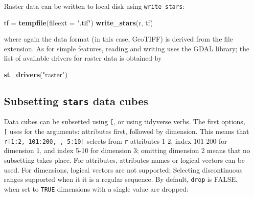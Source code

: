\documentclass[]{book}
\newenvironment{Shaded}{\begin{snugshade}}{\end{snugshade}}
\newcommand{\CommentTok}[1]{\textcolor[rgb]{0.56,0.35,0.01}{\textit{#1}}}
\newcommand{\DataTypeTok}[1]{\textcolor[rgb]{0.13,0.29,0.53}{#1}}
\newcommand{\DecValTok}[1]{\textcolor[rgb]{0.00,0.00,0.81}{#1}}
\newcommand{\KeywordTok}[1]{\textcolor[rgb]{0.13,0.29,0.53}{\textbf{#1}}}
\newcommand{\NormalTok}[1]{#1}
\newcommand{\OperatorTok}[1]{\textcolor[rgb]{0.81,0.36,0.00}{\textbf{#1}}}
\newcommand{\OtherTok}[1]{\textcolor[rgb]{0.56,0.35,0.01}{#1}}
\newcommand{\StringTok}[1]{\textcolor[rgb]{0.31,0.60,0.02}{#1}}
\begin{document}
Raster data can be written to local disk using \texttt{write\_stars}:

\begin{Shaded}
\begin{Highlighting}[]
\NormalTok{tf =}\StringTok{ }\KeywordTok{tempfile}\NormalTok{(}\DataTypeTok{fileext =} \StringTok{".tif"}\NormalTok{)}
\KeywordTok{write_stars}\NormalTok{(r, tf)}
\end{Highlighting}
\end{Shaded}

where again the data format (in this case, GeoTIFF) is derived from the file
extension. As for simple features, reading and writing uses the GDAL
library; the list of available drivers for raster data is obtained
by

\begin{Shaded}
\begin{Highlighting}[]
\KeywordTok{st_drivers}\NormalTok{(}\StringTok{"raster"}\NormalTok{)}
\end{Highlighting}
\end{Shaded}

\hypertarget{subsetting-stars-data-cubes}{%
\subsection{\texorpdfstring{Subsetting \texttt{stars} data cubes}{Subsetting stars data cubes}}\label{subsetting-stars-data-cubes}}

Data cubes can be subsetted using \texttt{{[}}, or using tidyverse verbs. The
first options, \texttt{{[}} uses for the arguments: attributes first,
followed by dimension. This means that \texttt{r{[}1:2,\ 101:200,\ ,\ 5:10{]}}
selects from \texttt{r} attributes 1-2, index 101-200 for dimension 1, and index
5-10 for dimension 3; omitting dimension 2 means that no subsetting
takes place. For attributes, attributes names or logical vectors
can be used. For dimensions, logical vectors are not supported;
Selecting discontinuous ranges supported when it it is a regular
sequence. By default, \texttt{drop} is FALSE, when set to \texttt{TRUE} dimensions
with a single value are dropped:

\begin{Shaded}
\end{Shaded}
\end{document}

